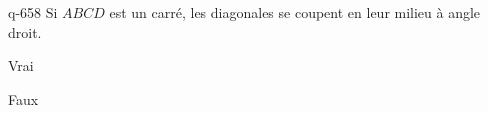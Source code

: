 \begin{truefalse}{q-658}
Si $ABCD$ est un carré, les diagonales se coupent en leur milieu à angle droit.
\item* Vrai
\item Faux
\end{truefalse}

